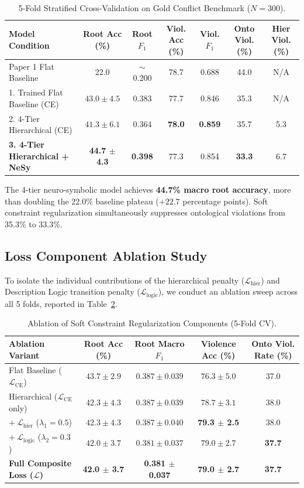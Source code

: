 \documentclass[11pt,a4paper]{article}
\begin{document}
\begin{table}[ht]
\centering
\small
\caption{5-Fold Stratified Cross-Validation on Gold Conflict Benchmark ($N=300$).}
\label{tab:cv_results}
\begin{tabular}{lcccccc}
\toprule
\textbf{Model Condition} & \textbf{Root Acc (\%)} & \textbf{Root $F_1$} & \textbf{Viol. Acc (\%)} & \textbf{Viol. $F_1$} & \textbf{Onto Viol. (\%)} & \textbf{Hier Viol. (\%)} \\
\midrule
Paper 1 Flat Baseline & 22.0 & $\sim$0.200 & 78.7 & 0.688 & 44.0 & N/A \\
1. Trained Flat Baseline (CE) & $43.0 \pm 4.5$ & 0.383 & 77.7 & 0.846 & 35.3 & N/A \\
2. 4-Tier Hierarchical (CE) & $41.3 \pm 6.1$ & 0.364 & \textbf{78.0} & \textbf{0.859} & 35.7 & 5.3 \\
\textbf{3. 4-Tier Hierarchical + NeSy} & \textbf{44.7 $\pm$ 4.3} & \textbf{0.398} & 77.3 & 0.854 & \textbf{33.3} & 6.7 \\
\bottomrule
\end{tabular}
\end{table}

The 4-tier neuro-symbolic model achieves \textbf{44.7\% macro root accuracy}, more than doubling the 22.0\% baseline plateau ($+22.7$ percentage points). Soft constraint regularization simultaneously suppresses ontological violations from 35.3\% to 33.3\%.

\subsection{Loss Component Ablation Study}
To isolate the individual contributions of the hierarchical penalty ($\mathcal{L}_{\text{hier}}$) and Description Logic transition penalty ($\mathcal{L}_{\text{logic}}$), we conduct an ablation sweep across all 5 folds, reported in Table~\ref{tab:ablation}.

\begin{table}[ht]
\centering
\small
\caption{Ablation of Soft Constraint Regularization Components (5-Fold CV).}
\label{tab:ablation}
\begin{tabular}{lcccc}
\toprule
\textbf{Ablation Variant} & \textbf{Root Acc (\%)} & \textbf{Root Macro $F_1$} & \textbf{Violence Acc (\%)} & \textbf{Onto Viol. Rate (\%)} \\
\midrule
Flat Baseline ($\mathcal{L}_{\text{CE}}$) & $43.7 \pm 2.9$ & $0.387 \pm 0.039$ & $76.3 \pm 5.0$ & 37.0 \\
Hierarchical ($\mathcal{L}_{\text{CE}}$ only) & $42.3 \pm 4.3$ & $0.387 \pm 0.039$ & $78.7 \pm 3.1$ & 38.0 \\
$+\ \mathcal{L}_{\text{hier}}$ ($\lambda_1 = 0.5$) & $42.3 \pm 4.3$ & $0.387 \pm 0.040$ & \textbf{79.3 $\pm$ 2.5} & 38.0 \\
$+\ \mathcal{L}_{\text{logic}}$ ($\lambda_2 = 0.3$) & $42.0 \pm 3.7$ & $0.381 \pm 0.037$ & $79.0 \pm 2.7$ & \textbf{37.7} \\
\textbf{Full Composite Loss ($\mathcal{L}$)} & \textbf{42.0 $\pm$ 3.7} & \textbf{0.381 $\pm$ 0.037} & \textbf{79.0 $\pm$ 2.7} & \textbf{37.7} \\
\bottomrule
\end{tabular}
\end{table}
\end{document}

